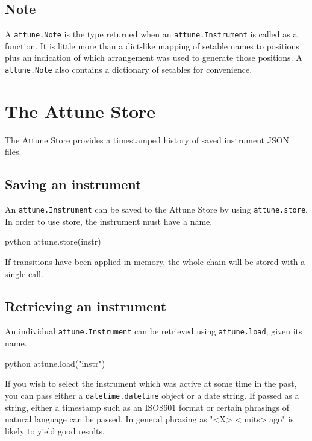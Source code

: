 \hypertarget{note}{%
\subsection{Note}\label{note}}

A \texttt{attune.Note} is the type returned when an
\texttt{attune.Instrument} is called as a function. It
is little more than a dict-like mapping of setable names to positions
plus an indication of which arrangement was used to generate those
positions. A \texttt{attune.Note} also contains a
dictionary of setables for convenience.

\hypertarget{store}{%
\section{The Attune Store}\label{store}}

The Attune Store provides a timestamped history of saved instrument JSON
files.

\hypertarget{saving-an-instrument}{%
\subsection{Saving an instrument}\label{saving-an-instrument}}

An \texttt{attune.Instrument} can be saved to the
Attune Store by using \texttt{attune.store}. In order to use store, the
instrument must have a name.

\begin{codefragment}{python}
attune.store(instr)
\end{codefragment}

If transitions have been applied in memory, the whole chain will be
stored with a single call.

\hypertarget{retrieving-an-instrument}{%
\subsection{Retrieving an instrument}\label{retrieving-an-instrument}}

An individual \texttt{attune.Instrument} can be
retrieved using \texttt{attune.load}, given its name.

\begin{codefragment}{python}
attune.load("instr")
\end{codefragment}

If you wish to select the instrument which was active at some time in
the past, you can pass either a
\texttt{datetime.datetime} object or a date string. If
passed as a string, either a timestamp such as an ISO8601 format or
certain phrasings of natural language can be passed. In general phrasing
as "\textless X\textgreater{} \textless units\textgreater{} ago" is
likely to yield good results.

